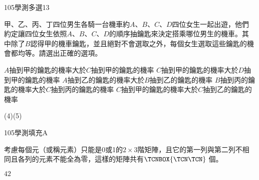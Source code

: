     \begin{QUESTION}
        \begin{ExamInfo}{105}{學測}{多選}{13}
        \end{ExamInfo}
        \begin{ExamAnsRateInfo}{56}{77}{58}{33}
        \end{ExamAnsRateInfo}
        \begin{QBODY}
            甲、乙、丙、丁四位男生各騎一台機車約$A$、$B$、$C$、$D$四位女生一起出遊，他們約定讓四位女生依照$A$、$B$、$C$、$D$的順序抽鑰匙來決定搭乘哪位男生的機車。其中除了$B$認得甲的機車鑰匙，並且絕對不會選取之外，每個女生選取這些鑰匙的機會都均等。請選出正確的選項。
			\begin{QOPS}
				\QOP $A$抽到甲的鑰匙的機率大於$C$抽到甲的鑰匙的機率
				\QOP $C$抽到甲的鑰匙的機率大於$D$抽到甲的鑰匙的機率
				\QOP $A$抽到乙的鑰匙的機率大於$B$抽到乙的鑰匙的機率
				\QOP $B$抽到丙的鑰匙的機率大於$C$抽到丙的鑰匙的機率
				\QOP $C$抽到甲的鑰匙的機率大於$C$抽到乙的鑰匙的機率
			\end{QOPS}
        \end{QBODY}
        \begin{QFROMS}
        \end{QFROMS}
        \begin{QTAGS}\end{QTAGS}
        \begin{QANS}
            (4)(5)
        \end{QANS}
        \begin{QSOLLIST}
        \end{QSOLLIST}
        \begin{QEMPTYSPACE}
        \end{QEMPTYSPACE}
    \end{QUESTION}
    \begin{QUESTION}
        \begin{ExamInfo}{105}{學測}{填充}{A}
        \end{ExamInfo}
        \begin{ExamAnsRateInfo}{22}{47}{16}{3}
        \end{ExamAnsRateInfo}
        \begin{QBODY}
            考慮每個元（或稱元素）只能是0或1的$2\times 3$階矩陣，且它的第一列與第二列不相同且各列的元素不能全為零，這樣的矩陣共有$\TCNBOX{\TCN\TCN}$ 個。
        \end{QBODY}
        \begin{QFROMS}
        \end{QFROMS}
        \begin{QTAGS}\end{QTAGS}
        \begin{QANS}
            $42$
        \end{QANS}
        \begin{QSOLLIST}
        \end{QSOLLIST}
        \begin{QEMPTYSPACE}
        \end{QEMPTYSPACE}
    \end{QUESTION}
